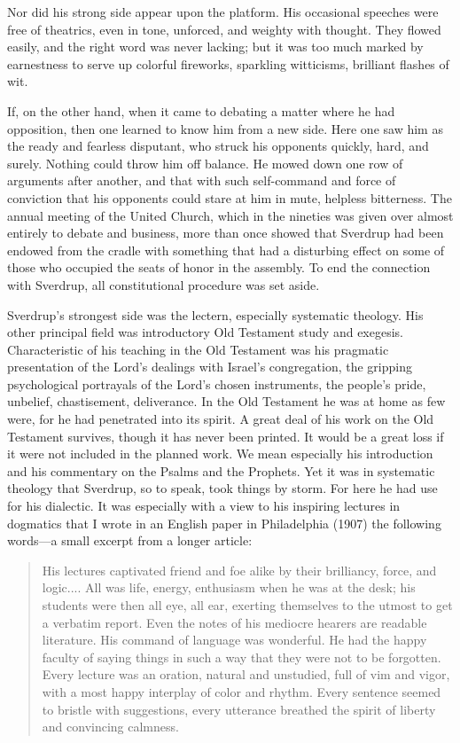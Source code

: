 Nor did his strong side appear upon the platform. His occasional speeches were free of theatrics, even in tone, unforced, and weighty with thought. They flowed easily, and the right word was never lacking; but it was too much marked by earnestness to serve up colorful fireworks, sparkling witticisms, brilliant flashes of wit.

If, on the other hand, when it came to debating a matter where he had opposition, then one learned to know him from a new side. Here one saw him as the ready and fearless disputant, who struck his opponents quickly, hard, and surely. Nothing could throw him off balance. He mowed down one row of arguments after another, and that with such self-command and force of conviction that his opponents could stare at him in mute, helpless bitterness. The annual meeting of the United Church, which in the nineties was given over almost entirely to debate and business, more than once showed that Sverdrup had been endowed from the cradle with something that had a disturbing effect on some of those who occupied the seats of honor in the assembly. To end the connection with Sverdrup, all constitutional procedure was set aside.

Sverdrup’s strongest side was the lectern, especially systematic theology. His other principal field was introductory Old Testament study and exegesis. Characteristic of his teaching in the Old Testament was his pragmatic presentation of the Lord’s dealings with Israel’s congregation, the gripping psychological portrayals of the Lord’s chosen instruments, the people’s pride, unbelief, chastisement, deliverance. In the Old Testament he was at home as few were, for he had penetrated into its spirit. A great deal of his work on the Old Testament survives, though it has never been printed. It would be a great loss if it were not included in the planned work. We mean especially his introduction and his commentary on the Psalms and the Prophets. Yet it was in systematic theology that Sverdrup, so to speak, took things by storm. For here he had use for his dialectic. It was especially with a view to his inspiring lectures in dogmatics that I wrote in an English paper in Philadelphia (1907) the following words—a small excerpt from a longer article:

\begin{quote}
His lectures captivated friend and foe alike by their brilliancy, force, and logic.... All was life, energy, enthusiasm when he was at the desk; his students were then all eye, all ear, exerting themselves to the utmost to get a verbatim report. Even the notes of his mediocre hearers are readable literature. His command of language was wonderful. He had the happy faculty of saying things in such a way that they were not to be forgotten. Every lecture was an oration, natural and unstudied, full of vim and vigor, with a most happy interplay of color and rhythm. Every sentence seemed to bristle with suggestions, every utterance breathed the spirit of liberty and convincing calmness.
\end{quote}

